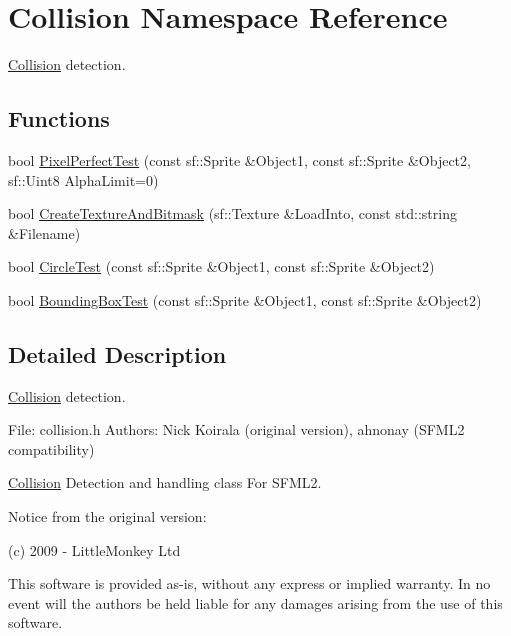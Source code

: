\hypertarget{namespace_collision}{}\section{Collision Namespace Reference}
\label{namespace_collision}


\mbox{\hyperlink{namespace_collision}{Collision}} detection.  


\subsection*{Functions}
\begin{DoxyCompactItemize}
\item 
bool \mbox{\hyperlink{namespace_collision_a5514da2189b7230dd266ac6ada2fcc5b}{Pixel\+Perfect\+Test}} (const sf\+::\+Sprite \&Object1, const sf\+::\+Sprite \&Object2, sf\+::\+Uint8 Alpha\+Limit=0)
\item 
bool \mbox{\hyperlink{namespace_collision_a22b8e23d7fc5cb243d4365d1c179cf39}{Create\+Texture\+And\+Bitmask}} (sf\+::\+Texture \&Load\+Into, const std\+::string \&Filename)
\item 
bool \mbox{\hyperlink{namespace_collision_af2f8835beee81b76d04311c794c36c0f}{Circle\+Test}} (const sf\+::\+Sprite \&Object1, const sf\+::\+Sprite \&Object2)
\item 
bool \mbox{\hyperlink{namespace_collision_a6f5945d467e629017010b139062919c6}{Bounding\+Box\+Test}} (const sf\+::\+Sprite \&Object1, const sf\+::\+Sprite \&Object2)
\end{DoxyCompactItemize}


\subsection{Detailed Description}
\mbox{\hyperlink{namespace_collision}{Collision}} detection. 

File\+: collision.\+h Authors\+: Nick Koirala (original version), ahnonay (S\+F\+M\+L2 compatibility)

\mbox{\hyperlink{namespace_collision}{Collision}} Detection and handling class For S\+F\+M\+L2.

Notice from the original version\+:

(c) 2009 -\/ Little\+Monkey Ltd

This software is provided \textquotesingle{}as-\/is\textquotesingle{}, without any express or implied warranty. In no event will the authors be held liable for any damages arising from the use of this software.

